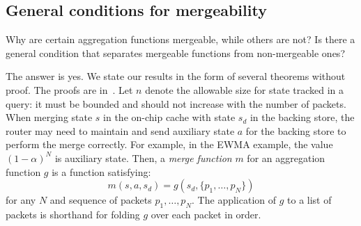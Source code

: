 \subsection{General conditions for mergeability}

Why are certain aggregation functions mergeable, while others are not? Is there
a general condition that separates mergeable functions from non-mergeable ones?

The answer is yes.
We state our results in the form of several theorems without proof. The proofs
are in~\cite{theory-tr}.
Let $n$ denote the allowable size for state tracked in a \TheSystem query: it must be bounded
and should not increase with the number of packets.
When merging state $s$ in the on-chip cache with state $s_d$ in the
backing store, the router may
need to maintain and send auxiliary state $a$ for the backing store to perform
the merge correctly. For example, in the EWMA example, the value $(1-\alpha)^N$
is auxiliary state. Then, a \emph{merge function} $m$ for an aggregation
function $g$ is a function
satisfying:
\[ m(s, a, s_d) = g(s_d, \{p_1, \ldots, p_N\}) \]
for any $N$ and sequence of packets $p_1, \ldots, p_N$. The application of $g$ to
a list of packets is shorthand for folding $g$ over each packet in order.

